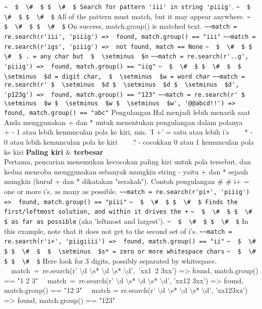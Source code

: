 \begin {enumerate}
\begin {enumerate}
\verb|~  $  \#  $ $  \#  $ Search for pattern 'iii' in string 'piiig'|.
\verb|~  $  \#  $ $  \#  $| All of the pattern must match, but it may appear anywhere.
\verb|~  $  \#  $ $  \#  $| On success, match.group() is matched text.
\verb|~~match = re.search(r'iii', 'piiig') =>  found, match.group() == "iii"|
\verb|~~match = re.search(r'igs', 'piiig') =>  not found, match == None|
\verb|~  $  \#  $ $  \#  $ . = any char but  $  \setminus  $n|
\verb|~~match = re.search(r'..g', 'piiig') =>  found, match.group() == "iig"|
\verb|~  $  \#  $ $  \#  $  $  \setminus  $d = digit char,  $  \setminus  $w = word char|
\verb|~~match = re.search(r' $  \setminus  $d $  \setminus  $d $  \setminus  $d', 'p123g') =>  found, match.group() == "123"|
\verb|~~match = re.search(r' $  \setminus  $w $  \setminus  $w $  \setminus  $w', '@@abcd!!') =>  found, match.group() == "abc"|
Pengulangan
Hal menjadi lebih menarik saat Anda menggunakan + dan * untuk menentukan pengulangan dalam polanya
~~~ + - 1 atau lebih kemunculan pola ke kiri, mis. 'I +' = satu atau lebih i's
~~~ * - 0 atau lebih kemunculan pola ke kiri
~~~ ? - cocokkan 0 atau 1 kemunculan pola ke kiri
{\fontsize{14pt}{14pt}\selectfont \textbf{Paling kiri  $  \&  $ terbesar} \\}
Pertama, pencarian menemukan kecocokan paling kiri untuk pola tersebut, dan kedua mencoba menggunakan sebanyak mungkin string - yaitu + dan * sejauh mungkin (huruf + dan * dikatakan "serakah").
Contoh pengulangan
 $  \#  $ $  \#  $ i+ = one or more i's, as many as possible.
\verb|~~match = re.search(r'pi+', 'piiig') =>  found, match.group() == "piii"|
\verb|~  $  \#  $ $  \#  $ Finds the first/leftmost solution, and within it drives the +|
\verb|~  $  \#  $ $  \#  $ as far as possible| (aka 'leftmost and largest').
\verb|~  $  \#  $ $  \#  $| In this example, note that it does not get to the second set of i's.
\verb|~~match = re.search(r'i+', 'piigiiii') =>  found, match.group() == "ii"|
\verb|~  $  \#  $ $  \#  $  $  \setminus  $s* = zero or more whitespace chars|
\verb|~  $  \#  $ $  \#  $| Here look for 3 digits, possibly separated by whitespace.
~~match~=~re.search(r' $  \setminus  $d $  \setminus  $s* $  \setminus  $d $  \setminus  $s* $  \setminus  $d',~'xx1~2   3xx') =>  found, match.group() == "1 2   3"
~~match~=~re.search(r' $  \setminus  $d $  \setminus  $s* $  \setminus  $d $  \setminus  $s* $  \setminus  $d', 'xx12  3xx') =>  found, match.group() == "12  3"
~~match = re.search(r' $  \setminus  $d $  \setminus  $s* $  \setminus  $d $  \setminus  $s* $  \setminus  $d', 'xx123xx') =>  found, match.group() == "123"

\end{enumerate}
\end{enumerate}
